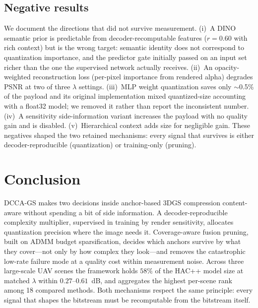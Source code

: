 \documentclass[conference]{IEEEtran}
\newcommand{\DCCA}{DCCA-GS}
\begin{document}
\subsection{Negative results}
We document the directions that did not survive measurement. (i)~A DINO
semantic prior is predictable from decoder-recomputable features ($r=0.60$
with rich context) but is the wrong target: semantic identity does not
correspond to quantization importance, and the predictor gate initially
passed on an input set richer than the one the supervised network actually
receives. (ii)~An opacity-weighted reconstruction loss (per-pixel importance
from rendered alpha) degrades PSNR at two of three $\lambda$ settings. (iii)~MLP
weight quantization saves only $\sim$0.5\% of the payload and its original
implementation mixed quantized-size accounting with a float32 model; we
removed it rather than report the inconsistent number. (iv)~A sensitivity
side-information variant increases the payload with no quality gain and is
disabled. (v)~Hierarchical context adds size for negligible gain. These
negatives shaped the two retained mechanisms: every signal that survives is
either decoder-reproducible (quantization) or training-only (pruning).

\section{Conclusion}
\DCCA{} makes two decisions inside anchor-based 3DGS compression content-aware
without spending a bit of side information. A decoder-reproducible complexity
multiplier, supervised in training by render sensitivity, allocates quantization
precision where the image needs it. Coverage-aware fusion pruning, built on ADMM
budget sparsification, decides which anchors survive by what they cover---not only
by how complex they look---and removes the catastrophic low-rate failure mode at a
quality cost within measurement noise. Across three large-scale UAV scenes the
framework holds $58\%$ of the HAC++ model size at matched $\lambda$ within
$0.27$--$0.61$~dB, and aggregates the highest per-scene rank among 18 compared
methods. Both mechanisms respect the same
principle: every signal that shapes the bitstream must be recomputable from the
bitstream itself.



\end{document}
